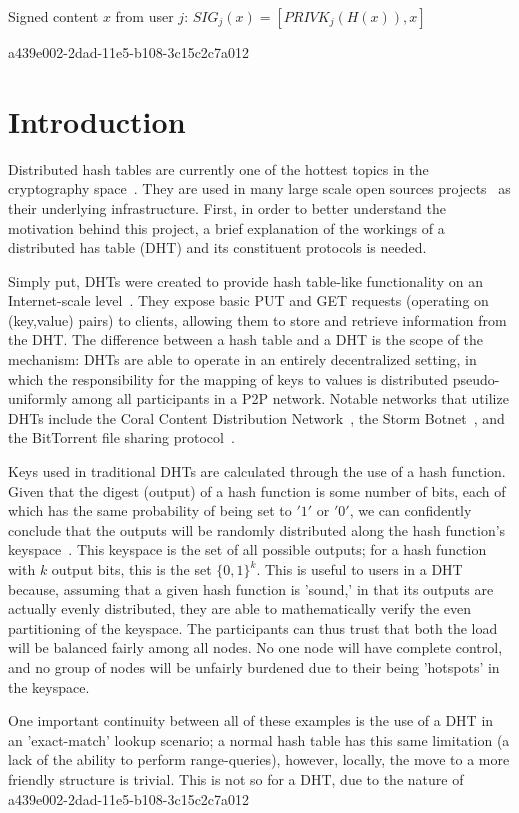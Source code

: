 \documentclass[12pt]{article}
\begin{document}
Signed content $x$ from user $j$: $SIG_j(x) = \left[ PRIVK_j( H(x) ), x \right]$

a439e002-2dad-11e5-b108-3c15c2c7a012\section{Introduction}
\par Distributed hash tables are currently one of the hottest topics in the cryptography space~\cite{Stoica:2001dj,Rowstron:2001ea,Ratnasamy:2001wn}. They are used in many large scale open sources projects~\cite{Freitas:2013tb,Xu:2010vs,Perfitt:2010fh} as their underlying infrastructure. First, in order to better understand the motivation behind this project, a brief explanation of the workings of a distributed has table (DHT) and its constituent protocols is needed.

\par Simply put, DHTs were created to provide hash table-like functionality on an Internet-scale level~\cite{Ratnasamy:2001wn}. They expose basic PUT and GET requests (operating on (key,value) pairs) to clients, allowing them to store and retrieve information from the DHT. The difference between a hash table and a DHT is the scope of the mechanism: DHTs are able to operate in an entirely decentralized setting, in which the responsibility for the mapping of keys to values is distributed pseudo-uniformly among all participants in a P2P network. Notable networks that utilize DHTs include the Coral Content Distribution Network~\cite{Freedman:2004vb}, the Storm Botnet~\cite{Holz:2008uk}, and the BitTorrent file sharing protocol~\cite{Cohen:y1_8mBnw}.

\par Keys used in traditional DHTs are calculated through the use of a hash function. Given that the digest (output) of a hash function is some number of bits, each of which has the same probability of being set to $'1'$ or $'0'$, we can confidently conclude that the outputs will be randomly distributed along the hash function's keyspace~. This keyspace is the set of all possible outputs; for a hash function with $k$ output bits, this is the set $\{0,1\}^k$. This is useful to users in a DHT because, assuming that a given hash function is 'sound,' in that its outputs are actually evenly distributed, they are able to mathematically verify the even partitioning of the keyspace. The participants can thus trust that both the load will be balanced fairly among all nodes. No one node will have complete control, and no group of nodes will be unfairly burdened due to their being 'hotspots' in the keyspace.~

\par One important continuity between all of these examples is the use of a DHT in an 'exact-match' lookup scenario; a normal hash table has this same limitation (a lack of the ability to perform range-queries), however, locally, the move to a more friendly structure is trivial. This is not so for a DHT, due to the nature of
\printbibliography
a439e002-2dad-11e5-b108-3c15c2c7a012
\end{document}
